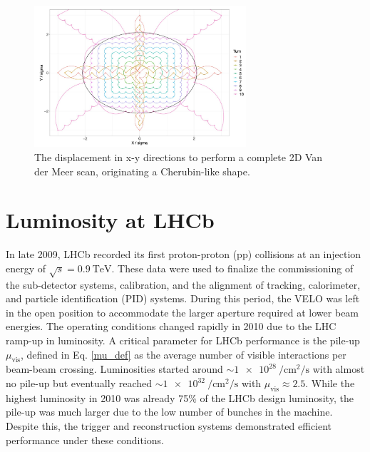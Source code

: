 \begin{figure}
    \centering
    \includegraphics[width=0.7\textwidth]{figures/vdm_steps_xy.png}
    \caption{The displacement in x-y directions to perform a complete 2D Van der Meer scan, originating a Cherubin-like shape.}
    \label{fig:vdm_steps_xy}
\end{figure}



\section{Luminosity at LHCb}
In late 2009, LHCb recorded its first proton-proton (pp) collisions at an injection energy of $\sqrt{s}=\SI{0.9}{\tera\eV}$. These data were used to finalize the commissioning of the sub-detector systems, calibration, and the alignment of tracking, calorimeter, and particle identification (PID) systems. During this period, the VELO was left in the open position to accommodate the larger aperture required at lower beam energies.
The operating conditions changed rapidly in 2010 due to the LHC ramp-up in luminosity. A critical parameter for LHCb performance is the pile-up \(\mu_{\text{vis}}\), defined in Eq. \ref{mu_def} as the average number of visible interactions per beam-beam crossing. Luminosities started around $\sim \SI{1e28}{\per\centi\meter\squared\per\second}$ with almost no pile-up but eventually reached $\sim \SI{1e32}{\per\centi\meter\squared\per\second}$ with $\mu_{\text{vis}} \approx 2.5$.
While the highest luminosity in 2010 was already 75\% of the LHCb design luminosity, the pile-up was much larger due to the low number of bunches in the machine. Despite this, the trigger and reconstruction systems demonstrated efficient performance under these conditions\cite{det_perf}.

